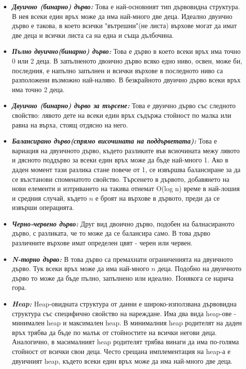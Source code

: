 \documentclass[11pt]{article} %
\newcommand{\italicBold}[1]{\textbf{\emph{#1}}}
\begin{document}
\begin{itemize}[noitemsep]
	\item \italicBold{Двуично (бинарно) дърво: } 
	Това е най-основният тип дървовидна структура. В нея всеки един връх може да има най-много две деца. Идеално двуично дърво е такова, в което всички "вътрешни"(не листа) върхове могат да имат две деца и всички листа са на една и съща дълбочина. 
	\item \italicBold{Пълно двуично(бинарно) дърво: } 
	Това е дърво в което всеки връх има точно 0 или 2 деца. В запълненото двоично дърво всяко едно ниво, освен, може би, последния, е напълно запълнен и всички върхове в последното ниво са разположени възможно най-наляво. В безкрайното двуично дърво всеки връх има точно 2 деца.
	\item \italicBold{Двуично (бинарно) дърво за търсене: } Това е двуично дърво със следното свойство: лявото дете на всеки един връх съдържа стойност по малка или равна на върха, стоящ отдясно на него.
	\item \italicBold{Балансирано дърво(спрямо височината на поддърветата): }
	Това е вариация на двуичното дърво, където разликите във всиочината межу лявото и дясното поддърво за всеки един връх може да бъде най-много 1. Ако в даден момент тази разлика стане повече от 1, се извършва балансиране за да се възстанови споменатото свойство. Търсенето в дървото, добавянето на нови елементи и изтриването на такива отнемат O(log n) време в най-лошия и средния случай, където $n$ е броят на върхове в дървото, преди да се извърши операцията. 
	\item \italicBold{Черно-червено дърво: }
	Друг вид двоично дърво, подобен на балнасираното дърво, с разликата, че то може да се балансира само. В това дърво различните върхове имат определен цвят - черен или червен. 
	\item \italicBold{N-торно дърво: }
	В това дърво са премахнати ограниченията на двуичното дърво. Тук всеки връх може да има най-много $n$ деца. Подобно на двуичното дърво то може да бъде пълно, запълнено или идеално. Понякога се нарича гора. 
	\item \italicBold{Heap: }
	Heap-овидната структура от данни е широко-използвана дървовидна структура със специфично свойство на нареждане. Има два вида heap-ове - минимален heap и максимален heap. В минималния heap родителят на даден връх трябва да бъде по малък от стойностите на всички негови деца. Аналогично, в масималният heap родителят трябва винаги да има по-голяма стойност от всички свои деца. Често срещана имплементация на heap-а е двуичният heap, където всеки един връх може да има най-много две деца.  
\end{itemize}
\end{document}
